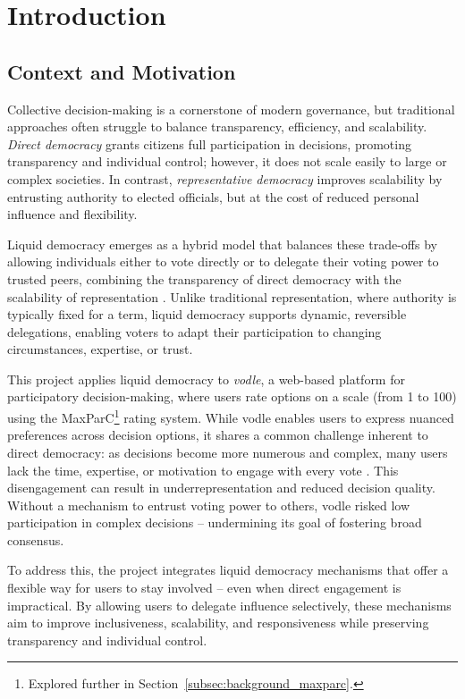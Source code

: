 \chapter{Introduction}\label{ch:introduction}

\section{Context and Motivation}

Collective decision-making is a cornerstone of modern governance, but traditional approaches often struggle to balance transparency, efficiency, and scalability. \textit{Direct democracy} grants citizens full participation in decisions, promoting transparency and individual control; however, it does not scale easily to large or complex societies. In contrast, \textit{representative democracy} improves scalability by entrusting authority to elected officials, but at the cost of reduced personal influence and flexibility.

Liquid democracy emerges as a hybrid model that balances these trade-offs by allowing individuals either to vote directly or to delegate their voting power to trusted peers, combining the transparency of direct democracy with the scalability of representation \citep{ford_delegative_2002, blum_liquid_2016}. Unlike traditional representation, where authority is typically fixed for a term, liquid democracy supports dynamic, reversible delegations, enabling voters to adapt their participation to changing circumstances, expertise, or trust.

This project applies liquid democracy to \textit{vodle}, a web-based platform for participatory decision-making, where users rate options on a scale (from 1 to 100) using the MaxParC\footnote{Explored further in Section~\ref{subsec:background_maxparc}.} rating system. While vodle enables users to express nuanced preferences across decision options, it shares a common challenge inherent to direct democracy: as decisions become more numerous and complex, many users lack the time, expertise, or motivation to engage with every vote \citep{ford_delegative_2002, blum_liquid_2016}. This disengagement can result in underrepresentation and reduced decision quality. Without a mechanism to entrust voting power to others, vodle risked low participation in complex decisions -- undermining its goal of fostering broad consensus.

To address this, the project integrates liquid democracy mechanisms that offer a flexible way for users to stay involved -- even when direct engagement is impractical. By allowing users to delegate influence selectively, these mechanisms aim to improve inclusiveness, scalability, and responsiveness while preserving transparency and individual control.


